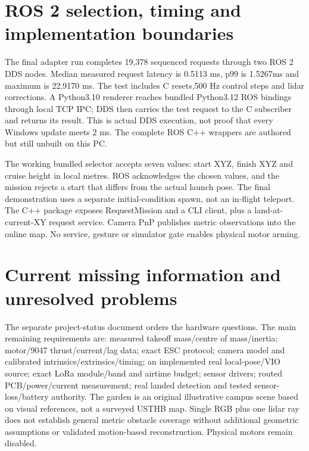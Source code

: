 \section{ROS 2 selection, timing and implementation boundaries}
The final adapter run completes 19,378 sequenced requests through two ROS 2 DDS nodes. Median measured request latency is 0.5113 ms, p99 is 1.5267ms and maximum is 22.9170 ms.
The test includes C resets,500 Hz control steps and lidar corrections.
A Python3.10 renderer reaches bundled Python3.12 ROS bindings through local
TCP IPC; DDS then carries the test request to the C subscriber and returns its
result. This is actual DDS execution, not proof that every Windows update meets
2  ms. The complete ROS C++ wrappers are authored but still unbuilt on this PC.

The working bundled selector accepts seven values: start XYZ, finish XYZ and
cruise height in local metres. ROS acknowledges the chosen values, and the
mission rejects a start that differs from the actual launch pose. The final
demonstration uses a separate initial-condition spawn, not an in-flight teleport.
The C++ package exposes RequestMission and a CLI client, plus a land-at-current-XY
request service. Camera PnP publishes metric observations into the online map.
No service, gesture or simulator gate enables physical motor arming.

\section{Current missing information and unresolved problems}
The separate project-status document orders the hardware questions. The main
remaining requirements are: measured takeoff mass/centre of mass/inertia;
motor/9047 thrust/current/lag data; exact ESC protocol; camera model and calibrated
intrinsics/extrinsics/timing; an implemented real local-pose/VIO source; exact
LoRa module/band and airtime budget; sensor drivers; routed PCB/power/current
measurement; real landed detection and tested sensor-loss/battery authority.
The garden is an original illustrative campus scene based on visual references,
not a surveyed USTHB map. Single RGB plus one lidar ray does not establish
general metric obstacle coverage without additional geometric assumptions or
validated motion-based reconstruction. Physical motors remain disabled.
